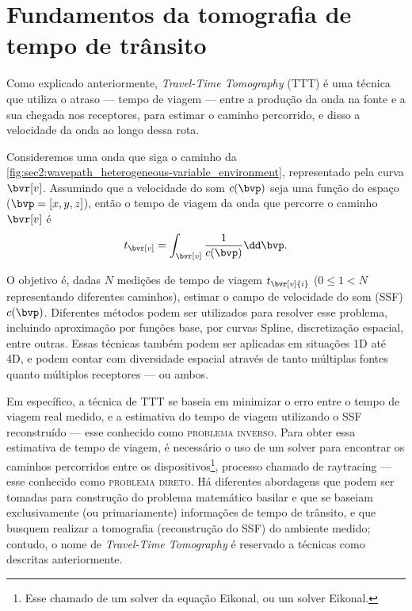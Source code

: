 \section{Fundamentos da tomografia de tempo de trânsito}
\label{sec_fttt}
Como explicado anteriormente, \textit{Travel-Time Tomography} (TTT) é uma técnica que utiliza o atraso --- tempo de viagem --- entre a produção da onda na fonte e a sua chegada nos receptores, para estimar o caminho percorrido, e disso a velocidade da onda ao longo dessa rota.



Consideremos uma onda que siga o caminho da \cref{fig:sec2:wavepath_heterogeneous-variable_environment}, representado pela curva $\bvr[v]$. Assumindo que a velocidade do som $c(\bvp)$ seja uma função do espaço ($\bvp = [x,y,z]$), então o tempo de viagem da onda que percorre o caminho $\bvr[v]$ é
\begin{equation}
	t_{\bvr[v]} = \int_{\bvr[v]} \frac{1}{c(\bvp)} \dd\bvp.
\end{equation}

O objetivo é, dadas $N$ medições de tempo de viagem $t_{\bvr[v]{i}}$ ($0 \leq 1 < N$ representando diferentes caminhos), estimar o campo de velocidade do som (SSF) $c(\bvp)$. Diferentes métodos podem ser utilizados para resolver esse problema, incluindo aproximação por funções base, por curvas Spline, discretização espacial, entre outras. Essas técnicas também podem ser aplicadas em situações 1D até 4D, e podem contar com diversidade espacial através de tanto múltiplas fontes quanto múltiplos receptores --- ou ambos.

Em específico, a técnica de TTT se baseia em minimizar o erro entre o tempo de viagem real medido, e a estimativa do tempo de viagem utilizando o SSF reconstruído --- esse conhecido como \textsc{problema inverso}. Para obter essa estimativa de tempo de viagem, é necessário o uso de um solver para encontrar os caminhos percorridos entre os dispositivos\footnote{Esse chamado de um solver da equação Eikonal, ou um solver Eikonal.}, processo chamado de raytracing --- esse conhecido como \textsc{problema direto}. Há diferentes abordagens que podem ser tomadas para construção do problema matemático basilar e que se baseiam exclusivamente (ou primariamente) informações de tempo de trânsito, e que busquem realizar a tomografia (reconstrução do SSF) do ambiente medido; contudo, o nome de \textit{Travel-Time Tomography} é reservado a técnicas como descritas anteriormente.

